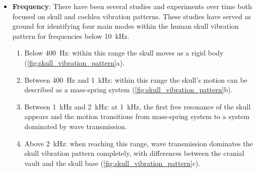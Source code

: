 \begin{itemize}
\item \textbf{Frequency}: There have been several studies and experiments over time both focused on skull and cochlea vibration patterns. These studies have served as ground for identifying four main modes within the human skull vibration pattern for frequencies below \SI{10}{\kilo\hertz}.
\begin{enumerate}
\item Below  \SI{400}{\hertz}: within this range the skull moves as a rigid body (\autoref{fig:skull_vibration_pattern}a).\citep{stenfelt_2005b}
\item Between  \SI{400}{\hertz} and \SI{1}{\kilo\hertz}: within this range the skull's motion can be described as a mass-spring system (\autoref{fig:skull_vibration_pattern}b).
\item Between \SI{1}{\kilo\hertz} and \SI{2}{\kilo\hertz}: at \SI{1}{\kilo\hertz}, the first free resonance of the skull appears \citep{hakansson_1994} and the motion transitions from mass-spring system to a system dominated by wave transmission.
\item Above \SI{2}{\kilo\hertz}: when reaching this range, wave transmission dominates the skull vibration pattern completely, with differences between the cranial vault and the skull base (\autoref{fig:skull_vibration_pattern}c).
\end{enumerate}




\end{itemize}
